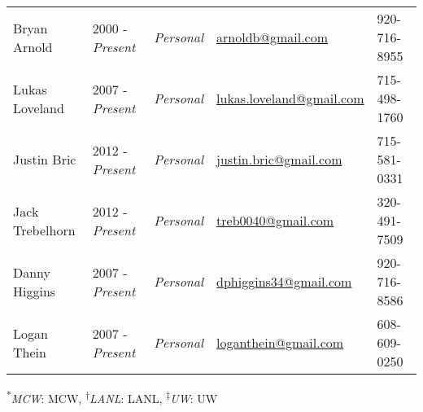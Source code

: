 \begin{center}
\begin{minipage}{\textwidth}
\begin{tabular}{p{3.2cm}p{2.2cm}p{3.7cm}p{5.0cm}p{2.4cm}}

Bryan Arnold & 2000 - \emph{Present} & \textit{Personal} &  \href{mailto:arnoldb@gmail.com}{arnoldb@gmail.com} &   920-716-8955 \\
Lukas Loveland & 2007 - \emph{Present} & \textit{Personal} &  \href{mailto:lukas.loveland@gmail.com}{lukas.loveland@gmail.com} &   715-498-1760\\ 
Justin Bric & 2012 - \emph{Present}& \textit{Personal} & \href{mailto:justin.bric@gmail.com}{justin.bric@gmail.com} &  715-581-0331 \\ 
Jack Trebelhorn & 2012 - \emph{Present} & \textit{Personal} & \href{mailto:treb0040@gmail.com}{treb0040@gmail.com} &   320-491-7509 \\
Danny Higgins & 2007 - \emph{Present} & \textit{Personal} & \href{mailto:dphiggins34@gmail.com}{dphiggins34@gmail.com} & 920-716-8586 \\
Logan Thein & 2007 - \emph{Present} & \textit{Personal} & \href{mailto:loganthein@gmail.com}{loganthein@gmail.com}  &   608-609-0250  \\

\end{tabular}
\end{minipage}
\end{center}

\begin{center}
\begin{minipage}{\textwidth}
\footnotesize
\centering
\textsuperscript{*}\textit{MCW}: MCW, \textsuperscript{$\dagger$}\textit{LANL}: LANL, \textsuperscript{$\ddagger$}\textit{UW}: UW \\
\end{minipage}
\end{center}





%
